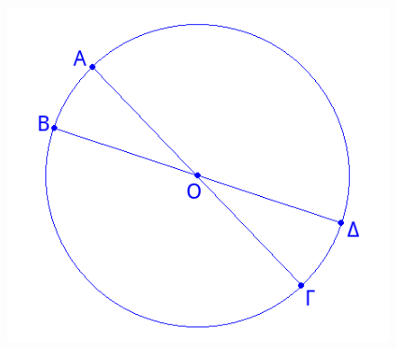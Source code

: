 \documentclass[a4paper,11pt]{report}
\begin{document}
\begin{figure}[ht]
\centering
\label{apotelesmata_sel14}
\includegraphics[scale=.4]{kyklos.png}
\end{figure}
\end{document}
